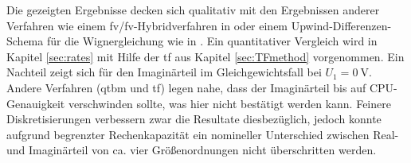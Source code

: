 Die gezeigten Ergebnisse decken sich qualitativ mit den Ergebnissen anderer Verfahren wie einem \ac{fv}/\ac{fv}-Hybridverfahren in \cite{lukas1} oder einem Upwind-Differenzen-Schema für die Wignergleichung wie in \cite{frensley2}. Ein quantitativer Vergleich wird in Kapitel \ref{sec:rates} mit Hilfe der \ac{tf} aus Kapitel \ref{sec:TFmethod} vorgenommen. Ein Nachteil zeigt sich für den Imaginärteil im Gleichgewichtsfall bei $U_1=\SI{0}{\volt}$. Andere Verfahren (\ac{qtbm} und \ac{tf}) legen nahe, dass der Imaginärteil bis auf CPU-Genauigkeit verschwinden sollte, was hier nicht bestätigt werden kann.
Feinere Diskretisierungen verbessern zwar die Resultate diesbezüglich, jedoch konnte aufgrund begrenzter Rechenkapazität ein nomineller Unterschied zwischen Real- und Imaginärteil von ca. vier Größenordnungen nicht überschritten werden.
\clearpage

